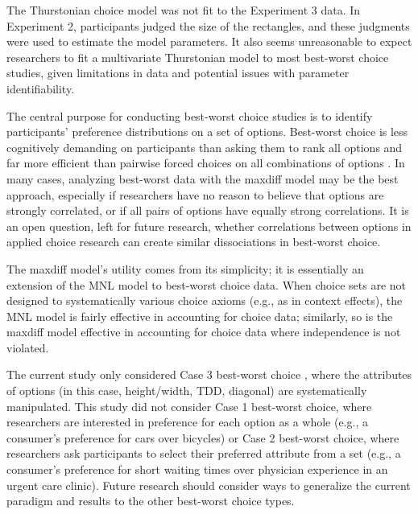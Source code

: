 
The Thurstonian choice model was not fit to the Experiment 3 data. In Experiment 2, participants judged the size of the rectangles, and these judgments were used to estimate the model parameters. It also seems unreasonable to expect researchers to fit a multivariate Thurstonian model to most best-worst choice studies, given limitations in data and potential issues with parameter identifiability. 

The central purpose for conducting best-worst choice studies is to identify participants' preference distributions on a set of options. Best-worst choice is less cognitively demanding on participants than asking them to rank all options and far more efficient than pairwise forced choices on all combinations of options \parencite{louviere2008modeling}. In many cases, analyzing best-worst data with the maxdiff model may be the best approach, especially if researchers have no reason to believe that options are strongly correlated, or if all pairs of options have equally strong correlations. It is an open question, left for future research, whether correlations between options in applied choice research can create similar dissociations in best-worst choice. 

The maxdiff model's utility comes from its simplicity; it is essentially an extension of the MNL model to best-worst choice data. When choice sets are not designed to systematically various choice axioms (e.g., as in context effects), the MNL model is fairly effective in accounting for choice data; similarly, so is the maxdiff model effective in accounting for choice data where independence is not violated.

The current study only considered Case 3 best-worst choice \parencite{marleyModelsBestWorst2012}, where the attributes of options (in this case, height/width, TDD, diagonal) are systematically manipulated. This study did not consider Case 1 best-worst choice, where researchers are interested in preference for each option as a whole (e.g., a consumer's preference for cars over bicycles) or Case 2 best-worst choice, where researchers ask participants to select their preferred attribute from a set (e.g., a consumer's preference for short waiting times over physician experience in an urgent care clinic). Future research should consider ways to generalize the current paradigm and results to the other best-worst choice types.
